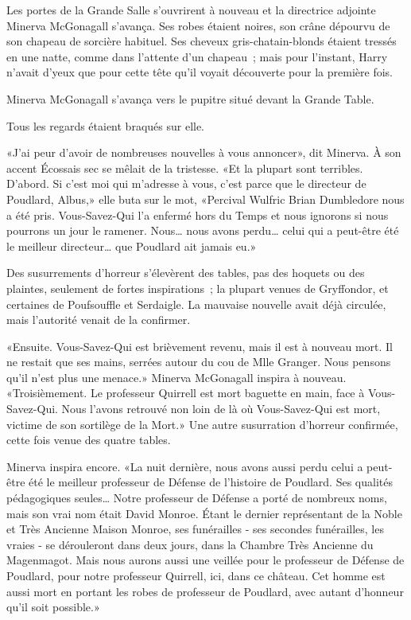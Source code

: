 Les portes de la Grande Salle s'ouvrirent à nouveau et la directrice adjointe Minerva McGonagall s'avança. Ses robes étaient noires, son crâne dépourvu de son chapeau de sorcière habituel. Ses cheveux gris-chatain-blonds étaient tressés en une natte, comme dans l'attente d'un chapeau~; mais pour l'instant, Harry n'avait d'yeux que pour cette tête qu'il voyait découverte pour la première fois.

Minerva McGonagall s'avança vers le pupitre situé devant la Grande Table.

Tous les regards étaient braqués sur elle.

«J'ai peur d'avoir de nombreuses nouvelles à vous annoncer», dit Minerva. À son accent Écossais sec se mêlait de la tristesse. «Et la plupart sont terribles. D'abord. Si c'est moi qui m'adresse à vous, c'est parce que le directeur de Poudlard, Albus,» elle buta sur le mot, «Percival Wulfric Brian Dumbledore nous a été pris. Vous-Savez-Qui l'a enfermé hors du Temps et nous ignorons si nous pourrons un jour le ramener. Nous… nous avons perdu… celui qui a peut-être été le meilleur directeur… que Poudlard ait jamais eu.»

Des susurrements d'horreur s'élevèrent des tables, pas des hoquets ou des plaintes, seulement de fortes inspirations~; la plupart venues de Gryffondor, et certaines de Poufsouffle et Serdaigle. La mauvaise nouvelle avait déjà circulée, mais l'autorité venait de la confirmer.

«Ensuite. Vous-Savez-Qui est brièvement revenu, mais il est à nouveau mort. Il ne restait que ses mains, serrées autour du cou de Mlle Granger. Nous pensons qu'il n'est plus une menace.» Minerva McGonagall inspira à nouveau. «Troisièmement. Le professeur Quirrell est mort baguette en main, face à Vous-Savez-Qui. Nous l'avons retrouvé non loin de là où Vous-Savez-Qui est mort, victime de son sortilège de la Mort.» Une autre susurration d'horreur confirmée, cette fois venue des quatre tables.

Minerva inspira encore. «La nuit dernière, nous avons aussi perdu celui a peut-être été le meilleur professeur de Défense de l'histoire de Poudlard. Ses qualités pédagogiques seules… Notre professeur de Défense a porté de nombreux noms, mais son vrai nom était David Monroe. Étant le dernier représentant de la Noble et Très Ancienne Maison Monroe, ses funérailles - ses secondes funérailles, les vraies - se dérouleront dans deux jours, dans la Chambre Très Ancienne du Magenmagot. Mais nous aurons aussi une veillée pour le professeur de Défense de Poudlard, pour notre professeur Quirrell, ici, dans ce château. Cet homme est aussi mort en portant les robes de professeur de Poudlard, avec autant d'honneur qu'il soit possible.»

